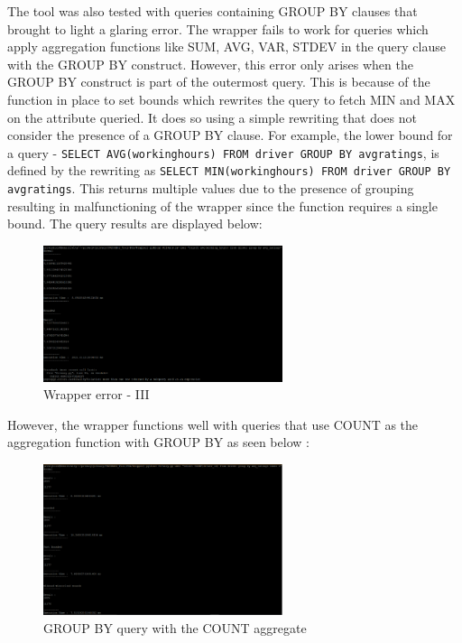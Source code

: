 \documentclass[acmsmall]{acmart}
\begin{document}
The tool was also tested with queries containing GROUP BY clauses that brought to light a glaring error. The wrapper fails to work for queries which apply aggregation functions like SUM, AVG, VAR, STDEV in the query clause with the GROUP BY construct. However, this error only arises when the GROUP BY construct is part of the outermost query. This is because of the function in place to set bounds which rewrites the query to fetch MIN and MAX on the attribute queried. It does so using a simple rewriting that does not consider the presence of a GROUP BY clause. For example, the lower bound for a query - \texttt{SELECT AVG(working\textunderscore hours) FROM driver GROUP BY avg\textunderscore ratings}, is defined by the rewriting as \texttt{SELECT MIN(working\textunderscore hours) FROM driver GROUP BY avg\textunderscore ratings}. This returns multiple values due to the presence of grouping resulting in malfunctioning of the wrapper since the function requires a single bound. The query results are displayed below:
\begin{figure}[htp]
    \centering
    \includegraphics[width=7cm]{Fig 4.3.9.png}
    \caption{Wrapper error - III}
    \label{Fig:4.3.9}
\end{figure}

However, the wrapper functions well with queries that use COUNT as the aggregation function with GROUP BY as seen below :
\begin{figure}[htp]
    \centering
    \includegraphics[width=7cm]{Fig 4.3.10.png}
    \caption{GROUP BY query with the COUNT aggregate}
    \label{Fig:4.3.10}
\end{figure}
\end{document}
